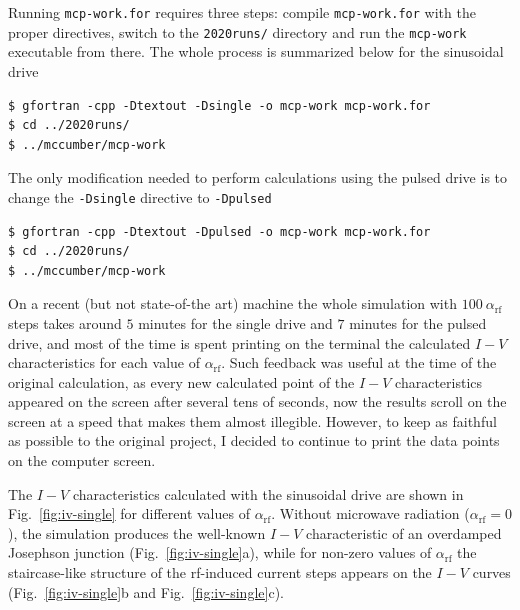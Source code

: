 Running \texttt{mcp-work.for} requires three steps: compile \texttt{mcp-work.for} with the proper directives, switch to the \texttt{2020runs/} directory and run the \texttt{mcp-work} executable from there. The whole process is summarized below for the sinusoidal drive

\begin{verbatim}
$ gfortran -cpp -Dtextout -Dsingle -o mcp-work mcp-work.for
$ cd ../2020runs/
$ ../mccumber/mcp-work
\end{verbatim}


The only modification needed to perform calculations using the pulsed drive is to change the \texttt{-Dsingle} directive to \texttt{-Dpulsed}

\begin{verbatim}
$ gfortran -cpp -Dtextout -Dpulsed -o mcp-work mcp-work.for
$ cd ../2020runs/
$ ../mccumber/mcp-work
\end{verbatim}


On a recent (but not state-of-the art) machine the whole simulation with $100~\alpha_\mathrm{rf}$ steps takes around $5$ minutes for the single drive and $7$ minutes for the pulsed drive, and most of the time is spent printing on the terminal the calculated $I - V$ characteristics for each value of $\alpha_\mathrm{rf}$. Such feedback was useful at the time of the original calculation, as every new calculated point of the $I - V$ characteristics appeared on the screen after several tens of seconds, now the results scroll on the screen at a speed that makes them almost illegible.
However, to keep as faithful as possible to the original project, I decided to continue to print the data points on the computer screen.

The $I - V$ characteristics calculated with the sinusoidal drive are shown in Fig.~\ref{fig:iv-single} for different values of $\alpha_\mathrm{rf}$.
Without microwave radiation ($\alpha_\mathrm{rf} = 0$), the simulation produces the well-known $I - V$ characteristic of an overdamped Josephson junction (Fig.~\ref{fig:iv-single}a), while for non-zero values of $\alpha_\mathrm{rf}$ the staircase-like structure of the rf-induced current steps appears on the $I - V$ curves (Fig.~\ref{fig:iv-single}b and Fig.~\ref{fig:iv-single}c).

